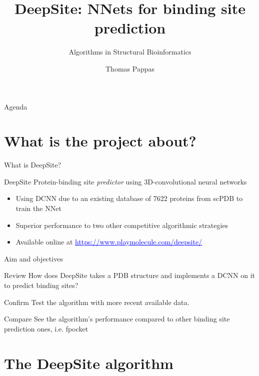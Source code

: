 \documentclass{beamer}
\newcommand{\link}[2]{\href{#1}{\textcolor{blue}{\underline{#2}}}}
\begin{document}
\title{DeepSite: NNets for binding site prediction}
\subtitle{Algorithms in Structural Bioinformatics}
\author{Thomas Pappas}
\maketitle

\begin{frame}{Agenda}
  \tableofcontents[hideallsubsections]
\end{frame}

\section{What is the project about?}

\begin{frame}{What is DeepSite?}
  \begin{block}{DeepSite}
    Protein-binding site \emph{predictor} using 3D-convolutional neural networks
    \begin{itemize}
      \item Using DCNN due to an existing database of 7622 proteins from scPDB to train the NNet
      \item Superior performance to two other competitive algorithmic strategies
      \item Available online at \link{https://www.playmolecule.com/deepsite/}{https://www.playmolecule.com/deepsite/}
    \end{itemize}
  \end{block}
\end{frame}

\begin{frame}{Aim and objectives}
  \begin{block}{Review}
    How does DeepSite takes a PDB structure and implements a DCNN on it to predict binding sites?
  \end{block}
  \begin{block}{Confirm}
    Test the algorithm with more recent available data.
  \end{block}
  \begin{block}{Compare}
    See the algorithm's performance compared to other binding site prediction ones, i.e. fpocket
  \end{block}
\end{frame}

\section{The DeepSite algorithm}
\end{document}
